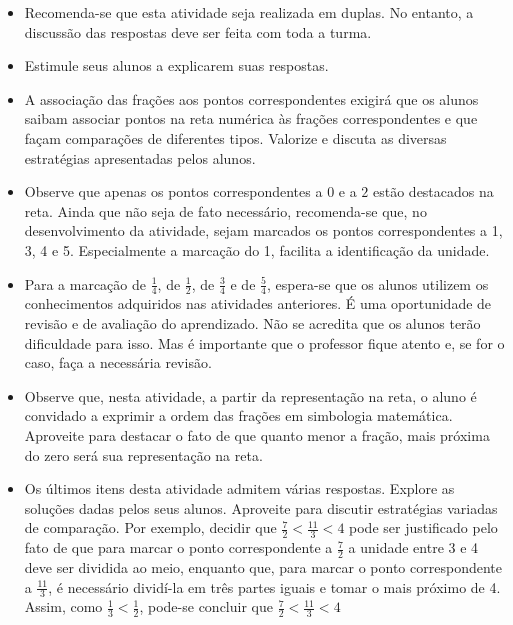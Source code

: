 \begin{multicols}{2}
\begin{itemize}
    \item       Recomenda-se que esta atividade seja realizada em duplas. No entanto, a discussão das respostas deve ser feita com toda a turma.
    \item       Estimule seus alunos a explicarem suas respostas.
    \item       A associação das frações aos pontos correspondentes exigirá que os alunos saibam associar pontos na reta numérica às frações correspondentes e que façam comparações de diferentes tipos. Valorize e discuta as diversas estratégias apresentadas pelos alunos. 
    \item       Observe que apenas os pontos correspondentes a       $0$       e a       $2$       estão destacados na reta. Ainda que não seja de fato necessário, recomenda-se que, no desenvolvimento da atividade, sejam marcados os pontos correspondentes a 1, 3, 4 e 5. Especialmente a marcação do 1, facilita a identificação da unidade.
    \item       Para a marcação de       $\frac{1}{4}$,      de $\frac{1}{2}$,   de    $\frac{3}{4}$       e   de    $\frac{5}{4}$, espera-se que os alunos utilizem os conhecimentos adquiridos nas atividades anteriores. É uma oportunidade de revisão e de avaliação do aprendizado. Não se acredita que os alunos terão dificuldade para isso. Mas é importante que o professor fique atento e, se for o caso, faça a necessária revisão. 
    \item       Observe que, nesta atividade, a partir da representação na reta, o aluno é convidado a exprimir a ordem das frações em simbologia matemática. Aproveite para destacar o fato de que quanto menor a fração, mais próxima do zero será sua representação na reta. 
    \item       Os últimos itens desta atividade admitem várias respostas. Explore as soluções dadas pelos seus alunos. Aproveite para discutir estratégias variadas de comparação. Por exemplo, decidir que       $\frac{7}{2} < \frac{11}{3} < 4$       pode ser justificado pelo fato de que para marcar o ponto correspondente a       $\frac{7}{2}$       a unidade entre 3 e 4 deve ser dividida ao meio, enquanto que, para marcar o ponto correspondente a       $\frac{11}{3}$, é necessário dividí-la em três partes iguais e tomar o mais próximo de 4. Assim, como       $\frac{1}{3} < \frac{1}{2}$, pode-se concluir que       $\frac{7}{2} < \frac{11}{3} < 4$
\end{itemize} %
  


\end{multicols}
